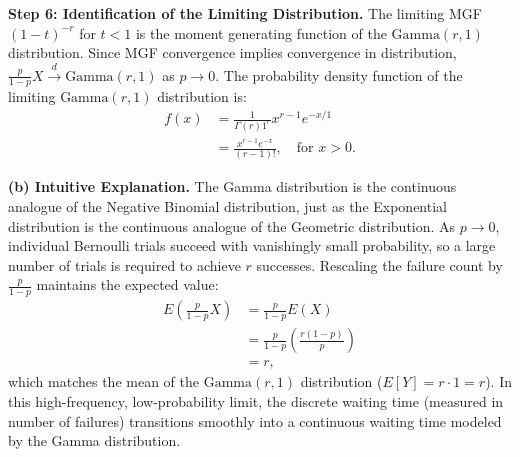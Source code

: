\documentclass[11pt,a4paper]{article}
\begin{document}
\noindent \textbf{Step 6: Identification of the Limiting Distribution.} The limiting MGF $(1 - t)^{-r}$ for $t < 1$ is the moment generating function of the $\text{Gamma}(r, 1)$ distribution. Since MGF convergence implies convergence in distribution, $\frac{p}{1-p}X \xrightarrow{d} \text{Gamma}(r, 1)$ as $p \to 0$. The probability density function of the limiting $\text{Gamma}(r, 1)$ distribution is:
\begin{align*}
f(x) &= \frac{1}{\Gamma(r) 1^r} x^{r-1} e^{-x/1} \\
&= \frac{x^{r-1} e^{-x}}{(r - 1)!}, \quad \text{for } x > 0.
\end{align*}

\vspace{4pt}
\noindent \textbf{(b) Intuitive Explanation.} The Gamma distribution is the continuous analogue of the Negative Binomial distribution, just as the Exponential distribution is the continuous analogue of the Geometric distribution. As $p \to 0$, individual Bernoulli trials succeed with vanishingly small probability, so a large number of trials is required to achieve $r$ successes. Rescaling the failure count by $\frac{p}{1-p}$ maintains the expected value:
\begin{align*}
E\left( \frac{p}{1-p} X \right) &= \frac{p}{1-p} E(X) \\
&= \frac{p}{1-p} \left( \frac{r(1-p)}{p} \right) \\
&= r,
\end{align*}
which matches the mean of the $\text{Gamma}(r, 1)$ distribution ($E[Y] = r \cdot 1 = r$). In this high-frequency, low-probability limit, the discrete waiting time (measured in number of failures) transitions smoothly into a continuous waiting time modeled by the Gamma distribution.
\end{document}

